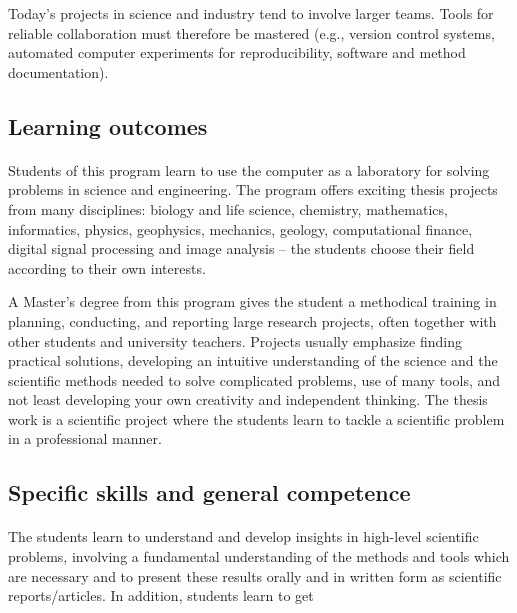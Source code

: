 \documentclass[%
oneside,                 %
final,                   %
10pt]{article}
\begin{document}
Today's projects in science and industry tend to involve larger teams. Tools for reliable collaboration must therefore be mastered (e.g., version control systems, automated computer experiments for reproducibility, software and method documentation).




\subsection*{Learning outcomes}

\paragraph{}
Students of this program learn to use the computer as a laboratory for solving problems in science and engineering. The program offers exciting thesis projects from many disciplines: biology and life science, chemistry, mathematics, informatics, physics, geophysics, mechanics, geology, computational finance, digital signal processing and image analysis  – the students choose their  field according to their own interests.

A Master’s degree from this program gives the student   a methodical training in planning, conducting, and reporting large research projects, often together with other students and university teachers.
Projects usually emphasize finding practical solutions,
developing an intuitive understanding of the science and the
scientific methods needed to solve complicated problems, use of many
tools, and not least developing your own creativity and independent
thinking. The thesis work is a scientific project where the students learn to
tackle a scientific problem in a professional manner.



\subsection*{Specific skills and general competence}

\paragraph{}
The students learn to understand and develop insights in high-level scientific problems, involving a fundamental understanding of the methods and tools which are necessary and to present these results orally and in written form as scientific reports/articles. In addition, students learn to get
\end{document}
